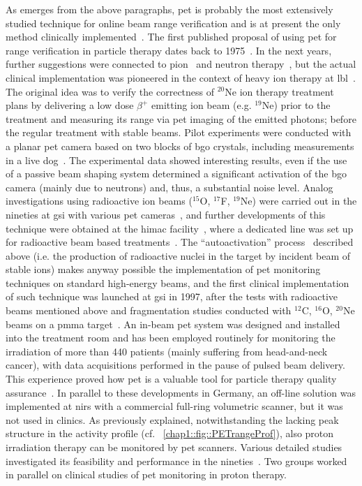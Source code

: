 As emerges from the above paragraphs, \gls{pet} is probably the most extensively studied technique for online beam range verification and is at present the only method clinically implemented~\parencite{Enghardt2004}. The first published proposal of using \gls{pet} for range verification in particle therapy dates back to 1975~\parencite{Bennett1975}. In the next years, further suggestions were connected to pion~\parencite{Goodman1986, Shirato1989} and neutron therapy~\parencite{Vynckier1989}, but the actual clinical implementation was pioneered in the context of heavy ion therapy at \gls{lbl}~\parencite{Llacer1979, Chatterjee1981}. The original idea was to verify the correctness of $^{20}$Ne ion therapy treatment plans by delivering a low dose $\beta^+$ emitting ion beam (e.g. $^{19}$Ne) prior to the treatment and measuring its range via \gls{pet} imaging of the emitted photons; before the regular treatment with stable beams. Pilot experiments were conducted with a planar \gls{pet} camera based on two blocks of \gls{bgo} crystals, including measurements in a live dog~\parencite{Llacer1984b}. The experimental data showed interesting results, even if the use of a passive beam shaping system determined a significant activation of the \gls{bgo} camera (mainly due to neutrons) and, thus, a substantial noise level. Analog investigations using radioactive ion beams ($^{15}$O, $^{17}$F, $^{19}$Ne) were carried out in the nineties at \gls{gsi} with various \gls{pet} cameras~\parencite{Pawelke1996}, and further developments of this technique were obtained at the \gls{himac} facility~\parencite{Iseki2004, Kitagawa2006}, where a dedicated line was set up for radioactive beam based treatments~\parencite{Urakabe2001, Kanazawa2002}. The \enquote{autoactivation} process~\parencite{Tobias1971} described above (i.e. the production of radioactive nuclei in the target by incident beam of stable ions) makes anyway possible the implementation of \gls{pet} monitoring techniques on standard high-energy beams, and the first clinical implementation of such  technique was launched at \gls{gsi} in 1997, after the tests with radioactive beams mentioned above and fragmentation studies conducted with $^{12}$C, $^{16}$O, $^{20}$Ne beams on a \gls{pmma} target~\parencite{Enghardt1992}. An in-beam \gls{pet} system was designed and installed into the treatment room and has been employed routinely for monitoring the irradiation of more than 440 patients (mainly suffering from head-and-neck cancer), with data acquisitions performed in the pause of pulsed beam delivery. This experience proved how \gls{pet} is a valuable tool for particle therapy quality assurance~\parencite{Enghardt2004}. In parallel to these developments in Germany, an off-line solution was implemented at \gls{nirs} with a commercial full-ring volumetric scanner, but it was not used in clinics. As previously explained, notwithstanding the lacking peak structure in the activity profile (cf. \figurename~\ref{chap1::fig::PETrangeProf}), also proton irradiation therapy can be monitored by \gls{pet} scanners. Various detailed studies investigated its feasibility and performance in the nineties~\parencite{Litzenberg1992, Paans1993, Oelfke1996, Litzenberg1999}. Two groups worked in parallel on clinical studies of \gls{pet} monitoring in proton therapy. 